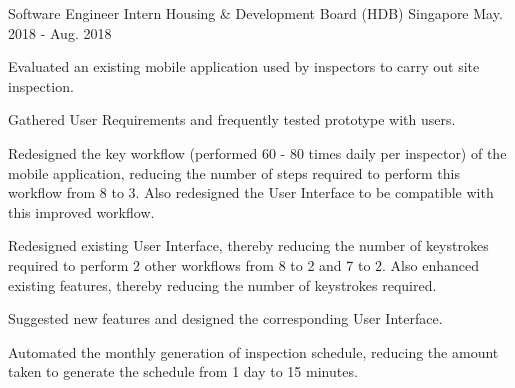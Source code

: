 

\begin{cventries}

  \cventry
    {Software Engineer Intern} %
    {Housing \& Development Board (HDB)} %
    {Singapore} %
    {May. 2018 - Aug. 2018} %
    {
      \begin{cvitems} %
        \item {Evaluated an existing mobile application used by inspectors to carry out site inspection.}
        \item {Gathered User Requirements and frequently tested prototype with users.}
        \item {Redesigned the key workflow (performed 60 - 80 times daily per inspector) of the mobile application, reducing the number of steps required to perform this workflow from 8 to 3. Also redesigned the User Interface to be compatible with this improved workflow.}
        \item {Redesigned existing User Interface, thereby reducing the number of keystrokes required to perform 2 other workflows from 8 to 2 and 7 to 2. Also enhanced existing features, thereby reducing the number of keystrokes required.}
        \item {Suggested new features and designed the corresponding User Interface.}
        \item {Automated the monthly generation of inspection schedule, reducing the amount taken to generate the schedule from 1 day to 15 minutes.}
      \end{cvitems}
    }


\end{cventries}
